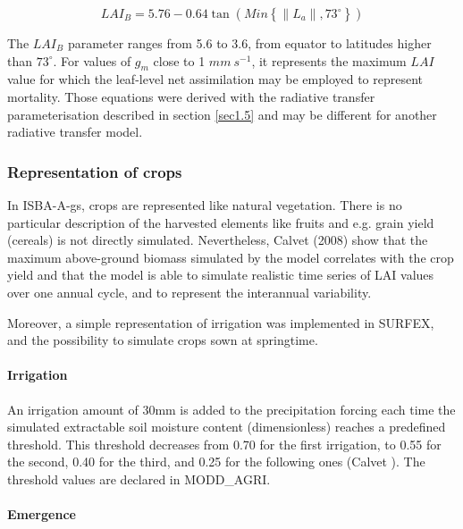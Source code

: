 {\begin{equation}
LAI_{B} = 5.76-0.64\tan \left (  Min  \left \{ \left \|  L_{a}  \right \|,73^{\circ}        \right \}       \right )
\end{equation}

The $LAI_{B}$ parameter ranges from 5.6 to 3.6, from equator to latitudes higher than $73^{\circ}$. For values of $g_{m}$
close to 1 $mm ~s^{-1}$, it represents the maximum $LAI$ value for which the leaf-level net assimilation may be
employed to represent mortality. Those equations were derived with the radiative transfer
parameterisation described in section \ref{sec1.5} and may be different for another radiative transfer model.

\subsubsection{Representation of crops}

In ISBA-A-gs, crops are represented like natural vegetation. There is no particular description of the
harvested elements like fruits and e.g. grain yield (cereals) is not directly simulated. Nevertheless,
Calvet \etal (2008) show that the maximum above-ground biomass simulated by the model correlates
with the crop yield and that the model is able to simulate realistic time series of LAI values over one
annual cycle, and to represent the interannual variability.

Moreover, a simple representation of irrigation was implemented in SURFEX, and the possibility to
simulate crops sown at springtime.

\paragraph{Irrigation}

An irrigation amount of 30mm is added to the precipitation forcing each time the simulated extractable
soil moisture content (dimensionless) reaches a predefined threshold. This threshold decreases from
0.70 for the first irrigation, to 0.55 for the second, 0.40 for the third, and 0.25 for the following ones
(Calvet ). The threshold values are declared in MODD\_AGRI.

\paragraph{Emergence}

}
